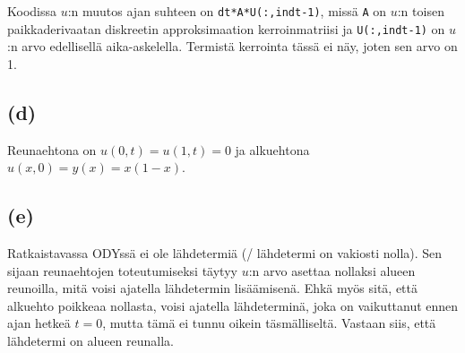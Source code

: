\documentclass{article}
\begin{document}
Koodissa $u$:n muutos ajan suhteen on
\texttt{dt*A*U(:,indt-1)}, missä \texttt{A} on
$u$:n toisen paikkaderivaatan diskreetin approksimaation kerroinmatriisi
ja \texttt{U(:,indt-1)} on $u$:n arvo edellisellä aika-askelella.
Termistä kerrointa tässä ei näy, joten sen arvo on 1.

\subsection*{(d)}

Reunaehtona on $u(0, t) = u(1, t) = 0$ ja alkuehtona $u(x, 0) = y(x) = x(1-x)$.

\subsection*{(e)}

Ratkaistavassa ODYssä ei ole lähdetermiä (/ lähdetermi on vakiosti nolla).
Sen sijaan reunaehtojen toteutumiseksi täytyy $u$:n arvo asettaa
nollaksi alueen reunoilla, mitä voisi ajatella lähdetermin lisäämisenä.
Ehkä myös sitä, että alkuehto poikkeaa nollasta, voisi ajatella
lähdeterminä, joka on vaikuttanut ennen ajan hetkeä $t = 0$,
mutta tämä ei tunnu oikein täsmälliseltä.
Vastaan siis, että lähdetermi on alueen reunalla.
\end{document}
